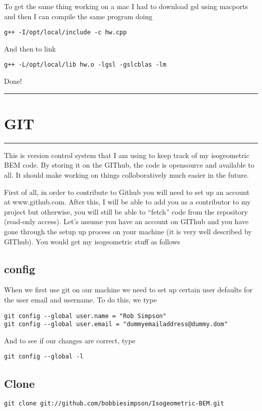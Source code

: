 \documentclass[a4paper, 10pt]{article}
\newcommand{\mytoprule}{\hrule\vspace{4mm}}
\newcommand{\mybotrule}{\vspace{4mm}\hrule}
\begin{document}
To get the same thing working on a mac I had to download gsl using macports and then I can compile the same program doing
\begin{Verbatim}
g++ -I/opt/local/include -c hw.cpp
\end{Verbatim}
And then to link
\begin{Verbatim}
g++ -L/opt/local/lib hw.o -lgsl -gslcblas -lm
\end{Verbatim}
Done!
\mybotrule

%

\vspace{10mm}
\section*{GIT}
\mytoprule

This is version control system that I am using to keep track of my isogeometric BEM code. By storing it on the GIThub, the code is opensource and available to all. It should make working on things colloboratively much easier in the future. 

First of all, in order to contribute to Github you will need to set up an account at www.github.com. After this, I will be able to add you as a contributor to my project but otherwise, you will still be able to ``fetch'' code from the repository (read-only access). Let's assume you have an account on GIThub and you have gone through the setup up process on your machine (it is very well described by GIThub). You would get my isogeometric stuff as follows

\subsection*{config}
\label{sec:config}

When we first use git on our machine we need to set up certain user
defaults for the user email and username. To do this, we type
\begin{verbatim}
git config --global user.name = "Rob Simpson"
git config --global user.email = "dummyemailaddress@dummy.dom"
\end{verbatim}
And to see if our changes are correct, type
\begin{verbatim}
git config --global -l
\end{verbatim}

\subsection*{Clone}
\begin{Verbatim}
git clone git://github.com/bobbiesimpson/Isogeometric-BEM.git
\end{Verbatim}
\end{document}
